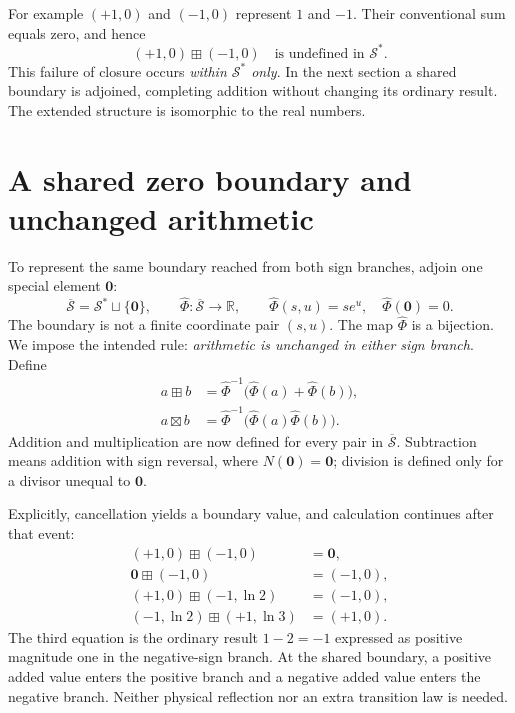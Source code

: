 \documentclass[11pt,a4paper]{article}
\newcommand{\Sstar}{\mathcal{S}^{\ast}}
\newcommand{\R}{\mathbb{R}}
\begin{document}
For example $(+1,0)$ and $(-1,0)$ represent $1$ and $-1$.
Their conventional sum equals zero, and hence
\begin{equation}
 (+1,0)\boxplus(-1,0)
 \quad\text{is undefined in }\Sstar.
\end{equation}
This failure of closure occurs \emph{within $\Sstar$ only}.
In the next section a shared boundary is adjoined, completing
addition without changing its ordinary result. The extended
structure is isomorphic to the real numbers.

\section{A shared zero boundary and unchanged arithmetic}
\label{sec:boundary}

To represent the same boundary reached from both sign branches,
adjoin one special element $\mathbf{0}$:
\begin{equation}
 \overline{\mathcal S}=\Sstar\sqcup\{\mathbf{0}\},\qquad
 \widehat\Phi:\overline{\mathcal S}\longrightarrow\R,\qquad
 \widehat\Phi(s,u)=s e^u,\quad \widehat\Phi(\mathbf{0})=0.
\end{equation}
The boundary is not a finite coordinate pair $(s,u)$. The map
$\widehat\Phi$ is a bijection. We impose the intended rule:
\emph{arithmetic is unchanged in either sign branch}.
Define
\begin{align}
 a\boxplus b&=\widehat\Phi^{-1}
  \bigl(\widehat\Phi(a)+\widehat\Phi(b)\bigr),\\
 a\boxtimes b&=\widehat\Phi^{-1}
  \bigl(\widehat\Phi(a)\widehat\Phi(b)\bigr).
\end{align}
Addition and multiplication are now defined for every pair in
$\overline{\mathcal S}$. Subtraction means addition with sign
reversal, where $N(\mathbf{0})=\mathbf{0}$; division is defined
only for a divisor unequal to $\mathbf{0}$.

Explicitly, cancellation yields a boundary value, and calculation
continues after that event:
\begin{align}
 (+1,0)\boxplus(-1,0)&=\mathbf{0},\\
 \mathbf{0}\boxplus(-1,0)&=(-1,0),\\
 (+1,0)\boxplus(-1,\ln 2)&=(-1,0),\\
 (-1,\ln 2)\boxplus(+1,\ln 3)&=(+1,0).
\end{align}
The third equation is the ordinary result $1-2=-1$ expressed
as positive magnitude one in the negative-sign branch.
At the shared boundary, a positive added value enters the positive
branch and a negative added value enters the negative branch.
Neither physical reflection nor an extra transition law is needed.
\end{document}
